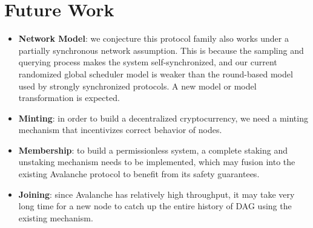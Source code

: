 \section{Future Work}
\begin{itemize}
    \item \textbf{Network Model}: we conjecture this protocol family also works
        under a partially synchronous network assumption. This is because the
        sampling and querying process makes the system self-synchronized,
        and our current randomized global scheduler model is weaker
        than the round-based model used by strongly synchronized protocols.
        A new model or model transformation is expected.
    \item \textbf{Minting}: in order to build a decentralized cryptocurrency,
        we need a minting mechanism that incentivizes correct behavior of nodes.
    \item \textbf{Membership}: to build a permissionless system, a complete
        staking and unstaking mechanism needs to be implemented, which may fusion into
        the existing Avalanche protocol to benefit from its safety guarantees.
    \item \textbf{Joining}: since Avalanche has relatively high throughput,
        it may take very long time for a new node to catch up the entire history of DAG using
        the existing mechanism.
\end{itemize}

